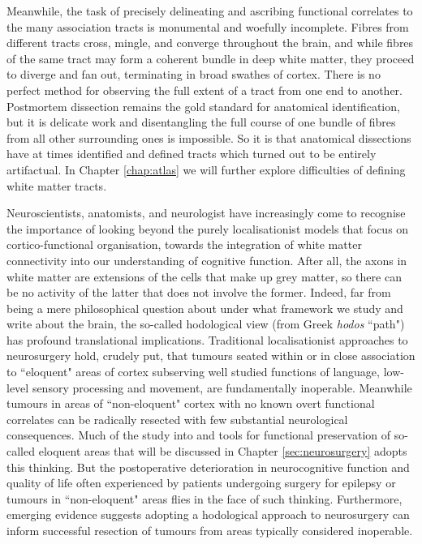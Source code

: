 Meanwhile, the task of precisely delineating and ascribing functional correlates to the many association tracts is monumental and woefully incomplete.
Fibres from different tracts cross, mingle, and converge throughout the brain, and while fibres of the same tract may form a coherent bundle in deep white matter, they proceed to diverge and fan out, terminating in broad swathes of cortex.
There is no perfect method for observing the full extent of a tract from one end to another.
Postmortem dissection remains the gold standard for anatomical identification, but it is delicate work and disentangling the full course of one bundle of fibres from all other surrounding ones is impossible.
So it is that anatomical dissections have at times identified and defined tracts which turned out to be entirely artifactual.
In Chapter \ref{chap:atlas} we will further explore difficulties of defining white matter tracts.

Neuroscientists, anatomists, and neurologist have increasingly come to recognise the importance of looking beyond the purely localisationist models that focus on cortico-functional organisation, towards the integration of white matter connectivity into our understanding of cognitive function.\autocite{ffytche2005,Catani2007}
After all, the axons in white matter are extensions of the cells that make up grey matter, so there can be no activity of the latter that does not involve the former.
Indeed, far from being a mere philosophical question about under what framework we study and write about the brain, the so-called hodological view (from Greek \textit{hodos} ``path") has profound translational implications.
Traditional localisationist approaches to neurosurgery hold, crudely put, that tumours seated within or in close association to ``eloquent" areas of cortex subserving well studied functions of language, low-level sensory processing and movement, are fundamentally inoperable.
Meanwhile tumours in areas of ``non-eloquent" cortex with no known overt functional correlates can be radically resected with few substantial neurological consequences.
Much of the study into and tools for functional preservation of so-called eloquent areas that will be discussed in Chapter \ref{sec:neurosurgery} adopts this thinking.
But the postoperative deterioration in neurocognitive function and quality of life often experienced by patients undergoing surgery for epilepsy or tumours in ``non-eloquent" areas flies in the face of such thinking.
\autocite{Satoer2017,Mandonnet2017a,Rijnen2019,Herbet2019,Vigren2020a,Dadario2021}
Furthermore, emerging evidence suggests adopting a hodological approach to neurosurgery can inform successful resection of tumours from areas typically considered inoperable.\autocite{Dadario2021,DeBenedictis2011b,Suzuki2023}

